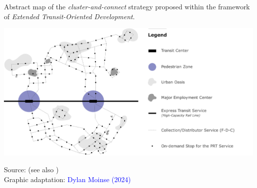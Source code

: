 \begin{refsegment}
\begin{carte}[h!]\vspace*{4pt}
        \caption{Abstract map of the \textsl{cluster-and-connect} strategy proposed within the framework of \textsl{Extended Transit-Oriented Development}.}
        \label{fig-chap1:schema-e-tod}
        \centerline{\includegraphics[width=1\columnwidth]{src/Figures/Chap-1/EN_Schema_Schneider.pdf}}
        \vspace{5pt}
        \begin{flushright}\scriptsize{
        Source: \textcolor{blue}{\textcite[142]{schneider_prt_1992}} (see also \textcolor{blue}{\textcite{schneider_illustrating_2012}})
        \\
        Graphic adaptation: \textcolor{blue}{Dylan Moinse (2024)}
        }\end{flushright}
    \end{carte}


\end{refsegment}
